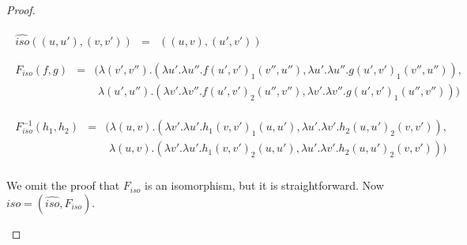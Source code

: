 \documentclass{elsarticle}
\begin{document}
\begin{proof}
\begin{report}
\begin{itemize}
\begin{center}
\begin{math}
\begin{array}{lll}
\begin{array}{rll}
            \hat{iso}((u,u'),(v,v')) & = & ((u,v),(u',v'))
          \end{array}\\\\        
          \begin{array}{rll}            
            F_{iso}(f,g) & = & (\lambda (v',v'').(\lambda u'.\lambda u''.f(u',v')_1(v'',u''),\lambda u'.\lambda u''.g(u',v')_1(v'',u'')),\\
            && \,\,\lambda (u',u'').(\lambda v'.\lambda v''.f(u',v')_2(u'',v''),\lambda v'.\lambda v''.g(u',v')_1(u'',v'')))\\
          \end{array}\\\\
          \begin{array}{rll}
            F_{iso}^{-1}(h_1,h_2) & = & (\lambda (u,v).(\lambda v'.\lambda u'.h_1(v,v')_1(u,u'),\lambda u'.\lambda v'.h_2(u,u')_2(v,v')),\\
            && \,\,\lambda (u,v).(\lambda v'.\lambda u'.h_1(v,v')_2(u,u'),\lambda u'.\lambda v'.h_2(u,u')_2(v,v')))\\
          \end{array}
        \end{array}
      \end{math}
    \end{center}
    We omit the proof that $F_{iso}$ is an isomorphism, but it is
    straightforward.  Now $iso = (\hat{iso},F_{iso})$.


\end{itemize}
\end{report}
\end{proof}
\end{document}
